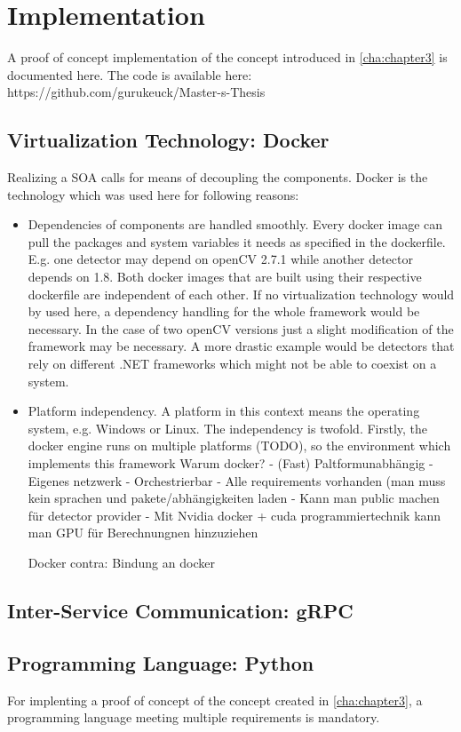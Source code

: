 \chapter{Implementation\label{cha:chapter4}}
A proof of concept implementation of the concept introduced in \ref{cha:chapter3} is documented here. The code is available here: https://github.com/gurukeuck/Master-s-Thesis

\section{Virtualization Technology: Docker}
Realizing a SOA calls for means of decoupling the components. Docker is the technology which was used here for following reasons:
\begin{itemize}
    \item Dependencies of components are handled smoothly. Every docker image can pull the packages and system variables it needs as specified in the dockerfile. E.g. one detector may depend on openCV 2.7.1 while another detector depends on 1.8. Both docker images that are built using their respective dockerfile are independent of each other. If no virtualization technology would by used here, a dependency handling for the whole framework would be necessary. In the case of two openCV versions just a slight modification of the framework may be necessary. A more drastic example would be detectors that rely on different .NET frameworks which might not be able to coexist on a system.
    \item Platform independency. A platform in this context means the operating system, e.g. Windows or Linux. The independency is twofold. Firstly, the docker engine runs on multiple platforms (TODO), so the environment which implements this framework 
    Warum docker?
	- (Fast) Paltformunabhängig
	- Eigenes netzwerk
	- Orchestrierbar
	- Alle requirements vorhanden (man muss kein sprachen und pakete/abhängigkeiten laden
	- Kann man public machen für detector provider
	- Mit Nvidia docker + cuda programmiertechnik kann man GPU für Berechnungnen hinzuziehen

Docker contra:
Bindung an docker
\end{itemize}


\section{Inter-Service Communication: gRPC}

\section{Programming Language: Python}
For implenting a proof of concept of the concept created in \ref{cha:chapter3}, a programming language meeting multiple requirements is mandatory. \\


